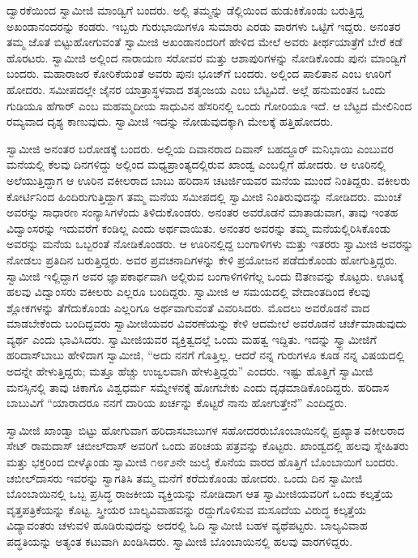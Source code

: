  ದ್ವಾರಕೆಯಿಂದ ಸ್ವಾಮೀಜಿ ಮಾಂಡ್ವಿಗೆ ಬಂದರು. ಅಲ್ಲಿ ತಮ್ಮನ್ನು ಡೆಲ್ಲಿಯಿಂದ ಹುಡುಕಿಕೊಂಡು ಬರುತ್ತಿದ್ದ ಅಖಂಡಾನಂದರನ್ನು ಕಂಡರು. ಇಬ್ಬರು ಗುರುಭಾಯಿಗಳೂ ಸುಮಾರು ಎರಡು ವಾರಗಳು ಒಟ್ಟಿಗೆ ಇದ್ದರು. ಅನಂತರ ತಮ್ಮ ಜೊತೆ ಬಿಟ್ಟುಹೋಗುವಂತೆ ಸ್ವಾಮೀಜಿ ಅಖಂಡಾನಂದರಿಗೆ ಹೇಳಿದ ಮೇಲೆ ಅವರು ತೀರ್ಥಯಾತ್ರೆಗೆ ಬೇರೆ ಕಡೆ ಹೊರಟರು. ಸ್ವಾಮೀಜಿ ಅಲ್ಲಿಂದ ನಾರಾಯಣ ಸರೋವರ ಮತ್ತು ಆಶಾಪುರಿಗಳನ್ನು ನೋಡಿಕೊಂಡು ಪುನಃ ಮಾಂಡ್ವಿಗೆ ಬಂದರು. ಮಹಾರಾಜರ ಕೋರಿಕೆಯಂತೆ ಅವರು ಪುನಃ ಭೂಜ್‍ಗೆ ಬಂದರು. ಅಲ್ಲಿಂದ ಪಾಲಿತಾನ ಎಂಬ ಊರಿಗೆ ಹೋದರು. ಸಮೀಪದಲ್ಲೇ ಜೈನರ ಯಾತ್ರಾಸ್ಥಳವಾದ ಶತೃಂಜಯ ಎಂಬ ಬೆಟ್ಟವಿದೆ. ಅಲ್ಲೆ ಹನುಮಂತನ ಒಂದು ಗುಡಿಯೂ ಹೆಗಾರ್ ಎಂಬ ಮಹಮ್ಮದೀಯ ಸಾಧುವಿನ ಹೆಸರಿನಲ್ಲಿ ಒಂದು ಗೋರಿಯೂ ಇದೆ. ಆ ಬೆಟ್ಟದ ಮೇಲಿನಿಂದ ರಮ್ಯವಾದ ದೃಶ್ಯ ಕಾಣುವುದು. ಸ್ವಾಮೀಜಿ ಇದನ್ನು ನೋಡುವುದಕ್ಕಾಗಿ ಮೇಲಕ್ಕೆ ಹತ್ತಿಹೋದರು. 

 ಸ್ವಾಮೀಜಿ ಅನಂತರ ಬರೋಡಕ್ಕೆ ಬಂದರು. ಅಲ್ಲಿಯ ದಿವಾನರಾದ ದಿವಾನ್ ಬಹದ್ದೂರ್ ಮನಿಭಾಯಿ ಎಂಬುವರ ಮನೆಯಲ್ಲಿ ಕೆಲವು ದಿನಗಳಿದ್ದು ಅಲ್ಲಿಂದ ಮಧ್ಯಪ್ರಾಂತ್ಯದಲ್ಲಿರುವ ಖಾಂಡ್ವ ಎಂಬಲ್ಲಿಗೆ ಹೋದರು. ಆ ಊರಿನಲ್ಲಿ ಅಲೆಯುತ್ತಿದ್ದಾಗ ಆ ಊರಿನ ವಕೀಲರಾದ ಬಾಬು ಹರಿದಾಸ ಚಟರ್ಜಿಯವರ ಮನೆಯ ಮುಂದೆ ನಿಂತಿದ್ದರು. ವಕೀಲರು ಕೋರ್ಟಿನಿಂದ ಹಿಂದಿರುಗುತ್ತಿದ್ದಾಗ ತಮ್ಮ ಮನೆಯ ಸಮೀಪದಲ್ಲಿ ಸ್ವಾಮೀಜಿ ನಿಂತಿರುವುದನ್ನು ನೋಡಿದರು. ಮುಂಚೆ ಅವರನ್ನು ಸಾಧಾರಣ ಸಂನ್ಯಾಸಿಗಳೆಂದು ತಿಳಿದುಕೊಂಡರು. ಅನಂತರ ಅವರೊಡನೆ ಮಾತಾಡುವಾಗ, ತಾವು ಇಂತಹ ವಿದ್ವಾಂಸರನ್ನು ಇದುವರೆಗೆ ಕಂಡಿಲ್ಲ ಎಂದು ಅರ್ಥವಾಯಿತು. ಅನಂತರ ಅವರನ್ನು ತಮ್ಮ ಮನೆಯಲ್ಲಿರಿಸಿಕೊಂಡು ಅವರನ್ನು ಮನೆಯ ಒಬ್ಬರಂತೆ ನೋಡಿಕೊಂಡರು. ಆ ಊರಿನಲ್ಲಿದ್ದ ಬಂಗಾಳಿಗಳು ಮತ್ತು ಇತರರು ಸ್ವಾಮೀಜಿ ಅವರನ್ನು ನೋಡಲು ಪ್ರತಿದಿನ ಬರುತ್ತಿದ್ದರು. ಅವರ ಪ್ರವಚನಾದಿಗಳನ್ನು ಕೇಳಿ ಪ್ರಯೋಜನ ಪಡೆದುಕೊಂಡು ಹೋಗುತ್ತಿದ್ದರು. ಸ್ವಾಮೀಜಿ ಇಲ್ಲಿದ್ದಾಗ ಅವರ ಜ್ಞಾಪಕಾರ್ಥವಾಗಿ ಅಲ್ಲಿರುವ ಬಂಗಾಳಿಗಳಿಗೆಲ್ಲ ಒಂದು ಔತಣವನ್ನು ಕೊಟ್ಟರು. ಊಟಕ್ಕೆ ಹಲವು ವಿದ್ವಾಂಸರು ವಕೀಲರು ಎಲ್ಲರೂ ಬಂದಿದ್ದರು. ಸ್ವಾಮೀಜಿ ಆ ಸಮಯದಲ್ಲಿ ವೇದಾಂತದಿಂದ ಕೆಲವು ಶ್ಲೋಕಗಳನ್ನು ತೆಗೆದುಕೊಂಡು ಎಲ್ಲರಿಗೂ ಅರ್ಥವಾಗುವಂತೆ ವಿವರಿಸಿದರು. ಮೊದಲು ಅವರೊಡನೆ ವಾದ ಮಾಡಬೇಕೆಂದು ಬಂದಿದ್ದವರು ಸ್ವಾಮೀಜಿಯವರ ವಿವರಣೆಯನ್ನು ಕೇಳಿ ಆದಮೇಲೆ ಅವರೊಡನೆ ಚರ್ಚೆಮಾಡುವುದು ವ್ಯರ್ಥ ಎಂದು ಭಾವಿಸಿದರು. ಸ್ವಾಮೀಜಿಯವರ ವ್ಯಕ್ತಿತ್ವದಲ್ಲೆ ಒಂದು ಮಹತ್ವ ಇದ್ದಿತು. ಇದನ್ನು ಸ್ವ್ಬಾಮೀಜಿಗೆ ಹರಿದಾಸ್‍ಬಾಬು ಹೇಳಿದಾಗ ಸ್ವಾಮೀಜಿ, “ಅದು ನನಗೆ ಗೊತ್ತಿಲ್ಲ. ಆದರೆ ನನ್ನ ಗುರುಗಳೂ ಕೂಡ ನನ್ನ ವಿಷಯದಲ್ಲಿ ಅದನ್ನೇ ಹೇಳುತ್ತಿದ್ದರು; ಮತ್ತೂ ಹೆಚ್ಚು ಉಜ್ವಲವಾಗಿ ಹೇಳುತ್ತಿದ್ದರು” ಎಂದರು. ಇಷ್ಟು ಹೊತ್ತಿಗೆ ಸ್ವಾಮೀಜಿ ಮನಸ್ಸಿನಲ್ಲಿ ತಾವು ಚಿಕಾಗೊ ವಿಶ್ವಧರ್ಮ ಸಮ್ಮೇಳನಕ್ಕೆ ಹೋಗಬೇಕು ಎಂದು ದೃಢಮಾಡಿಕೊಂದಿದ್ದರು. ಹರಿದಾಸ ಬಾಬುವಿಗೆ “ಯಾರಾದರೂ ನನಗೆ ದಾರಿಯ ಖರ್ಚನ್ನು ಕೊಟ್ಟರೆ ನಾನು ಹೋಗುತ್ತೇನೆ” ಎಂದಿದ್ದರು. 

ಸ್ವಾಮೀಜಿ ಖಾಂಡ್ವಾ ಬಿಟ್ಟು ಹೋಗುವಾಗ ಹರಿದಾಸಬಾಬುಗಳ ಸಹೋದರರು\break ಬೊಂಬಾಯಿನಲ್ಲಿ ಪ್ರಖ್ಯಾತ ವಕೀಲರಾದ ಸೇಟ್ ರಾಮದಾಸ್ ಚಬೀಲ್‍ದಾಸ್ ಅವರಿಗೆ ಒಂದು ಪರಿಚಯ ಪತ್ರವನ್ನು ಕೊಟ್ಟರು. ಖಾಂಡ್ವದಲ್ಲಿ ಹಲವು ಸ್ನೇಹಿತರು ಮತ್ತು ಭಕ್ತರಿಂದ ಬೀಳ್ಕೊಂಡು ಸ್ವಾಮೀಜಿ ೧೮೯೨ನೇ ಜುಲೈ ಕೊನೆಯ ವಾರದ ಹೊತ್ತಿಗೆ ಬೊಂಬಾಯಿಗೆ ಬಂದರು. ಚಬೀಲ್‍ದಾಸರು ಇವರನ್ನು ಸ್ವಾಗತಿಸಿ ತಮ್ಮ ಮನೆಗೆ ಕರೆದುಕೊಂಡು ಹೋದರು. ಒಂದು ದಿನ ಸ್ವಾಮೀಜಿ ಬೊಂಬಾಯಿನಲ್ಲಿ ಒಬ್ಬ ಪ್ರಸಿದ್ಧ ರಾಜಕೀಯ ವ್ಯಕ್ತಿಯನ್ನು ನೋಡಿದಾಗ ಆತ ಸ್ವಾಮೀಜಿಯವರಿಗೆ ಒಂದು ಕಲ್ಕತ್ತೆಯ ವೃತ್ತಪತ್ರಿಕೆಯನ್ನು ಕೊಟ್ಟ. ಸ್ತ್ರೀಯರ ಬಾಲ್ಯವಿವಾಹವನ್ನು ರದ್ದುಗೊಳಿಸುವ ಮಸೂದೆಯ ವಿರುದ್ಧ ಕಲ್ಕತ್ತೆಯ ವಿದ್ಯಾವಂತರು ಚಳುವಳಿ ಹೂಡಿರುವುದನ್ನು ಅದರಲ್ಲಿ ಓದಿ ಸ್ವಾಮೀಜಿ ಬಹಳ ವ್ಯಥೆಪಟ್ಟರು. ಬಾಲ್ಯವಿವಾಹ ಪದ್ಧತಿಯನ್ನು ಅತ್ಯಂತ ಕಟುವಾಗಿ ಖಂಡಿಸಿದರು. ಸ್ವಾಮೀಜಿ ಬೊಂಬಾಯಿನಲ್ಲಿ ಹಲವು ವಾರಗಳಿದ್ದರು.

